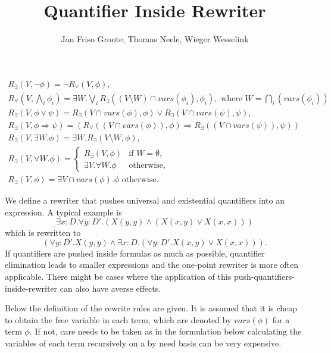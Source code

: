 \documentclass{article}
\title{Quantifier Inside Rewriter}
\author{Jan Friso Groote, Thomas Neele, Wieger Wesselink}
\newcommand{\vars}{\mathit{vars}}
\begin{document}
\maketitle

\[\begin{array}{l}
R_{\exists}(V,\neg \phi)=\neg R_{\forall}(V,\phi),\\
R_{\forall}(V,\bigwedge_i\phi_i) = \exists W.\bigvee_i R_\exists((V \setminus W) \cap \vars(\phi_i), \phi_i),
\text{ where } W = \bigcap_i(\vars(\phi_i)) \\
R_{\exists}(V,\phi\vee \psi)=R_{\exists}(V\cap \vars(\phi),\phi)\vee R_{\exists}(V\cap\vars(\psi),\psi),\\
R_{\exists}(V,\phi\Rightarrow\psi)=
(R_{\forall}((V\cap \vars(\phi)),\phi)\Rightarrow
R_{\exists}((V\cap\vars(\psi)),\psi))\\
R_{\exists}(V,\exists W.\phi)=\exists W.R_{\exists}(V\setminus W,\phi),\\
R_{\exists}(V,\forall W.\phi)=
\left\{\begin{array}{ll}
R_{\exists}(V,\phi)&\textrm{if }W=\emptyset,\\
\exists V.\forall W.\phi&\textrm{otherwise},
\end{array}\right.\\
R_{\exists}(V,\phi)=\exists V\cap\vars(\phi).\phi\textrm{ otherwise}.
\end{array}
\]

We define a rewriter that pushes universal and existential quantifiers into an
expression. A typical example is \[\exists x{:}D.\forall y{:}D'.(X(y,y)\wedge (X(x,y)\vee X(x,x)))\]
which is rewritten to
\[(\forall y{:}D'.X(y,y)\wedge \exists x{:}D.(\forall y{:}D'.X(x,y)\vee X(x,x))).\]
If quantifiers are pushed inside formulas as much as possible, quantifier elimination leads to smaller
expressions and the one-point rewriter is more often applicable. There might be cases where the
application of this push-quantifiers-inside-rewriter can also have averse effects.

Below the definition of the rewrite rules are given. It is assumed that it is cheap to obtain the
free variable in each term, which are denoted by $\vars(\phi)$ for a term $\phi$.
If not, care needs to be taken as in the formulation below calculating the
variables of each term recursively on a by need basis can be very expensive.
\end{document}
